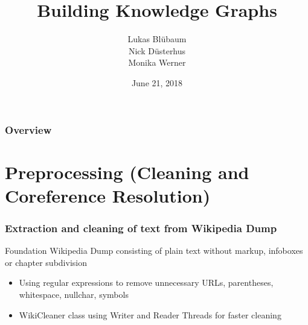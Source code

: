 \documentclass{beamer}
\title[BKG]{Building Knowledge Graphs} %
\author[Data Science]{Lukas Bl{\"u}baum \\ Nick D{\"u}sterhus \\ Monika Werner} %
\institute[UPB] %
{
University of Paderborn \\ %
\medskip
\textit{https://github.com/LukasBluebaum/BKG} %
}
\date{June 21, 2018} %
\begin{document}
\begin{frame}
\titlepage %
\end{frame}

\begin{frame}
\frametitle{Overview} %
\tableofcontents %
\end{frame}


\section{Preprocessing (Cleaning and Coreference Resolution)} %

\begin{frame}
\frametitle{Extraction and cleaning of text from Wikipedia Dump}
\begin{block}{Foundation}
	Wikipedia Dump consisting of plain text without markup, infoboxes or chapter subdivision 
\end{block}
\begin{itemize}
	\item Using regular expressions to remove unnecessary URLs, parentheses, whitespace, nullchar, symbols
	\item WikiCleaner class using Writer and Reader Threads for faster cleaning
\end{itemize}
\end{frame}

\end{document}
